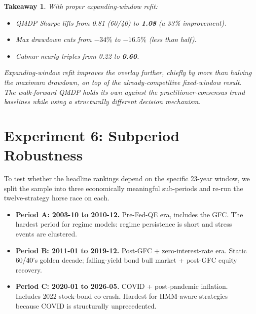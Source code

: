 \documentclass[11pt]{article}
\theoremstyle{plain1}
\theoremstyle{definition1}
\newtheorem*{takeaway}{Takeaway}
\newcommand{\1}{\mathbf{1}}
\begin{document}
\begin{takeaway}\rm
With proper expanding-window refit:
\begin{itemize}[leftmargin=1.5em]
  \item QMDP Sharpe lifts from 0.81 (60/40) to \textbf{1.08} (a 33\% improvement).
  \item Max drawdown cuts from $-34\%$ to $-\mathbf{16.5\%}$ (less than half).
  \item Calmar nearly triples from 0.22 to \textbf{0.60}.
\end{itemize}
Expanding-window refit improves the overlay further, chiefly by more than halving the maximum drawdown, on top of the already-competitive fixed-window result. The walk-forward QMDP holds its own against the practitioner-consensus trend baselines while using a structurally different decision mechanism.
\end{takeaway}

\section{Experiment 6: Subperiod Robustness}\label{sec:subperiod}

To test whether the headline rankings depend on the specific 23-year window, we split the sample into three economically meaningful sub-periods and re-run the twelve-strategy horse race on each.

\begin{itemize}[leftmargin=1.5em,itemsep=2pt]
  \item \textbf{Period A: 2003-10 to 2010-12.} Pre-Fed-QE era, includes the GFC. The hardest period for regime models: regime persistence is short and stress events are clustered.
  \item \textbf{Period B: 2011-01 to 2019-12.} Post-GFC + zero-interest-rate era. Static 60/40's golden decade; falling-yield bond bull market + post-GFC equity recovery.
  \item \textbf{Period C: 2020-01 to 2026-05.} COVID + post-pandemic inflation. Includes 2022 stock-bond co-crash. Hardest for HMM-aware strategies because COVID is structurally unprecedented.
\end{itemize}
\end{document}
